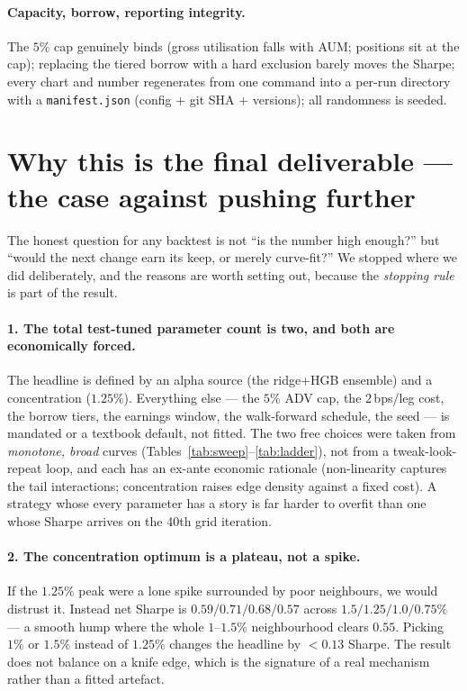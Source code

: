 \documentclass[11pt,a4paper]{article}
\newcommand{\code}[1]{\texttt{#1}}
\begin{document}
\paragraph{Capacity, borrow, reporting integrity.} The $5\%$ cap genuinely binds (gross utilisation falls with
AUM; positions sit at the cap); replacing the tiered borrow with a hard exclusion barely moves the Sharpe;
every chart and number regenerates from one command into a per-run directory with a \code{manifest.json}
(config + git SHA + versions); all randomness is seeded.

\section{Why this is the final deliverable --- the case against pushing further}\label{sec:overfit}
The honest question for any backtest is not ``is the number high enough?'' but ``would the next change earn its
keep, or merely curve-fit?'' We stopped where we did deliberately, and the reasons are worth setting out,
because the \emph{stopping rule} is part of the result.

\paragraph{1. The total test-tuned parameter count is two, and both are economically forced.} The headline is
defined by an alpha source (the ridge+HGB ensemble) and a concentration ($1.25\%$). Everything else --- the
$5\%$ ADV cap, the $2$\,bps/leg cost, the borrow tiers, the earnings window, the walk-forward schedule, the
seed --- is mandated or a textbook default, not fitted. The two free choices were taken from \emph{monotone,
broad} curves (Tables~\ref{tab:sweep}--\ref{tab:ladder}), not from a tweak-look-repeat loop, and each has an
ex-ante economic rationale (non-linearity captures the tail interactions; concentration raises edge density
against a fixed cost). A strategy whose every parameter has a story is far harder to overfit than one whose
Sharpe arrives on the 40th grid iteration.

\paragraph{2. The concentration optimum is a plateau, not a spike.} If the $1.25\%$ peak were a lone spike
surrounded by poor neighbours, we would distrust it. Instead net Sharpe is $0.59/0.71/0.68/0.57$ across
$1.5/1.25/1.0/0.75\%$ --- a smooth hump where the whole $1$--$1.5\%$ neighbourhood clears $0.55$. Picking $1\%$
or $1.5\%$ instead of $1.25\%$ changes the headline by $<0.13$ Sharpe. The result does not balance on a knife
edge, which is the signature of a real mechanism rather than a fitted artefact.
\end{document}
